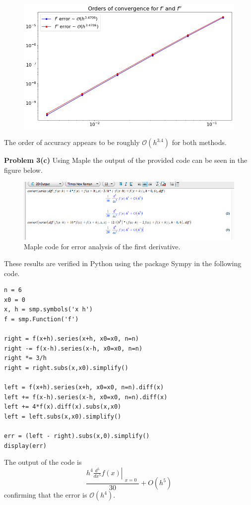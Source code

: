 \documentclass[12pt]{article}
\newcommand{\problem}[1]{\hspace{-4 ex} \large \textbf{Problem #1} }
\begin{document}
\begin{figure}[H]
	\includegraphics[width=.9\textwidth]{hw1_p3b_order_plot}
	\centering
\end{figure}

The order of accuracy appears to be roughly $\mathcal{O}(h^{3.4})$ for both methods.
\bigbreak

\problem{3(c)} Using Maple the output of the provided code can be seen in the figure below.
\begin{figure}[H]
	\caption{Maple code for error analysis of the first derivative.}
	\includegraphics[width=1\textwidth]{hw1_p3c_maple}
	\centering
\end{figure}
These results are verified in Python using the package Sympy in the following code.
\begin{lstlisting}
n = 6
x0 = 0
x, h = smp.symbols('x h')
f = smp.Function('f')

right = f(x+h).series(x+h, x0=x0, n=n)
right -= f(x-h).series(x-h, x0=x0, n=n)
right *= 3/h
right = right.subs(x,x0).simplify()

left = f(x+h).series(x+h, x0=x0, n=n).diff(x) 
left += f(x-h).series(x-h, x0=x0, n=n).diff(x)
left += 4*f(x).diff(x).subs(x,x0)
left = left.subs(x,x0).simplify()

err = (left - right).subs(x,0).simplify()
display(err)
\end{lstlisting}
The output of the code is
$$
\frac{h^{4} \left. \frac{d^{5}}{d x^{5}} f{\left (x \right )} \right|_{\substack{ x=0 }}}{30} + O\left(h^{5}\right)
$$
confirming that the error is $\mathcal{O}(h^4)$.
\bigbreak
\end{document}
